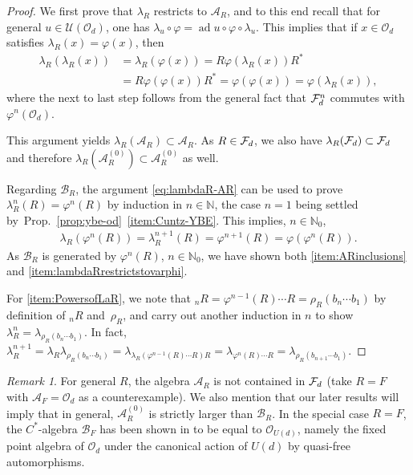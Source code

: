 \documentclass[12pt,a4paper]{amsart}
\numberwithin{equation}{section}
\theoremstyle{remark}
\newtheorem{remark}[theorem]{Remark}
\DeclareMathOperator{\ad}{ad}
\newcommand{\Nl}{\mathbb{N}}
\newcommand{\la}{\lambda}
\newcommand{\CA}[0]{\mathcal{A}} \newcommand{\CB}[0]{\mathcal{B}}
\newcommand{\CO}[0]{\mathcal{O}} \newcommand{\CP}[0]{\mathcal{P}}
\newcommand{\CU}[0]{\mathcal{U}} \newcommand{\CV}[0]{\mathcal{V}}
\begin{document}
\begin{proof}
    We first prove that $\la_R$ restricts to $\CA_R$, and to this end recall that for general $u\in\CU(\CO_d)$, one has $\la_u\circ\varphi=\ad u\circ\varphi\circ\la_u$. This implies that if $x\in\CO_d$ satisfies $\lambda_R(x)=\varphi(x)$, then 
	\begin{equation}\label{eq:lambdaR-AR}
	\begin{aligned}
	 \lambda_R(\lambda_R(x)) 
	 &= 
	 \lambda_R(\varphi(x)) 
	 = 
	 R\varphi(\lambda_R(x))R^* 
	 \\
	 &=
	 R\varphi(\varphi(x))R^* 
	 =
	 \varphi(\varphi(x)) = \varphi(\lambda_R(x))
	 ,
	\end{aligned}
    \end{equation}
	where the next to last step follows from the general fact that $\mathcal{F}_d^n$ commutes with $\varphi^n(\CO_d)$.
 
	This argument yields $\lambda_R(\CA_R)\subset\CA_R$. As $R\in\mathcal{F}_d$, we also have $\la_R(\CF_d)\subset\CF_d$ and therefore $\lambda_R(\CA_R^{(0)})\subset\CA_R^{(0)}$ as well.
	
	Regarding $\CB_R$, the argument \eqref{eq:lambdaR-AR} can be used to prove $\la_R^n(R)=\varphi^n(R)$ by induction in $n\in\Nl$, the case $n=1$ being settled by~Prop.~\ref{prop:ybe-od}~\ref{item:Cuntz-YBE}. This implies, $n\in\Nl_0$,
    \begin{align*}
     \la_R(\varphi^n(R))=\la_R^{n+1}(R)=\varphi^{n+1}(R)=\varphi(\varphi^n(R)).
    \end{align*}
    As $\CB_R$ is generated by $\varphi^n(R)$, $n\in\Nl_0$, we have shown both \ref{item:ARinclusions} and \ref{item:lambdaRrestrictstovarphi}.
    
    For \ref{item:PowersofLaR}, we note that ${}_nR=\varphi^{n-1}(R)\cdots R=\rho_R(b_n\cdots b_1)$ by definition of ${}_nR$ and~$\rho_R$, and carry out another induction in $n$ to show $\la_R^n=\la_{\rho_R(b_n\cdots b_1)}$. In fact, $\la_R^{n+1}=\la_R\la_{\rho_R(b_n\cdots b_1)}=\la_{\la_R(\varphi^{n-1}(R)\cdots R)R}=\la_{\varphi^n(R)\cdots R}=\la_{\rho_R(b_{n+1}\cdots b_1)}$.    
\end{proof}

\begin{remark}
	For general $R$, the algebra $\CA_R$ is not contained in $\mathcal{F}_d$ (take $R=F$ with $\CA_F=\CO_d$ as a counterexample). We also mention that our later results will imply that in general, $\CA_R^{(0)}$ is strictly larger than $\CB_R$. In the special case $R=F$, the $C^*$-algebra $\CB_F$	has been shown in \cite{DoplicherRoberts:1987} to be equal to $\CO_{U(d)}$, namely the fixed point algebra of $\CO_d$ under the canonical action of $U(d)$ by quasi-free automorphisms.
\end{remark}
 
\end{document}
